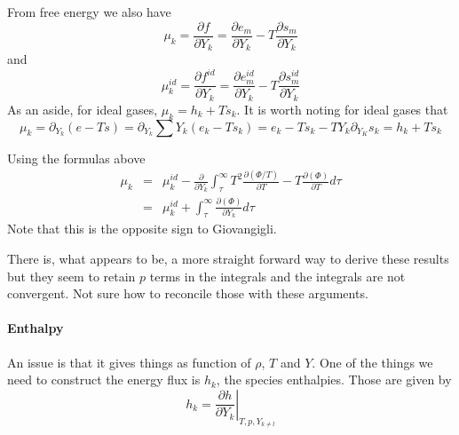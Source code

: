\documentclass[11pt]{article}
\begin{document}
From free energy we also have
\[
\mu_k = \frac{\partial f}{\partial Y_k} = 
 \frac{\partial e_m}{\partial Y_k} - 
 T\frac{\partial s_m}{\partial Y_k} 
\]
and
\[
\mu_k^{id} = \frac{\partial f^{id}}{\partial Y_k} = 
 \frac{\partial e_m^{id}}{\partial Y_k} - 
 T\frac{\partial s_m^{id}}{\partial Y_k} 
\]
As an aside, for ideal gases, $\mu_k = h_k + T s_k$.  It is worth noting for ideal gases 
that
\[
\mu_k = \partial_{Y_k} (e - T s) = 
 \partial_{Y_k} \sum Y_k(e_k - T s_k) = e_k - T s_k - T Y_k \partial_{Y_K}s_k = h_k + T s_k
\]

Using the formulas above
\begin{eqnarray}
\mu_k &=& \mu_k^{id} - \frac{\partial}{\partial Y_k} \int_\tau^\infty
 T^2 \frac{\partial (\Phi/T)} {\partial T} - T \frac{\partial (\Phi)} {\partial T} d\tau \\
 &=& \mu_k^{id} + \int_\tau^\infty \frac{\partial (\Phi)} {\partial Y_k} d\tau
\end{eqnarray}
Note that this is the opposite sign to Giovangigli.

There is, what appears to be, a more straight forward way to derive these results
but they seem to retain $p$ terms in the integrals
and the integrals are not convergent. Not sure how to reconcile those with these arguments.

%
%
%
\paragraph{Enthalpy}
An issue is that it gives things as function of $\rho$, $T$ and $Y$.  One of the
things we need to construct the energy flux is $h_k$, the species enthalpies.
Those are given by 
\[
h_k = \left. \frac{\partial h}{\partial Y_k} \right|_{T,p,Y_{k\ne l}}
\]
\end{document}

